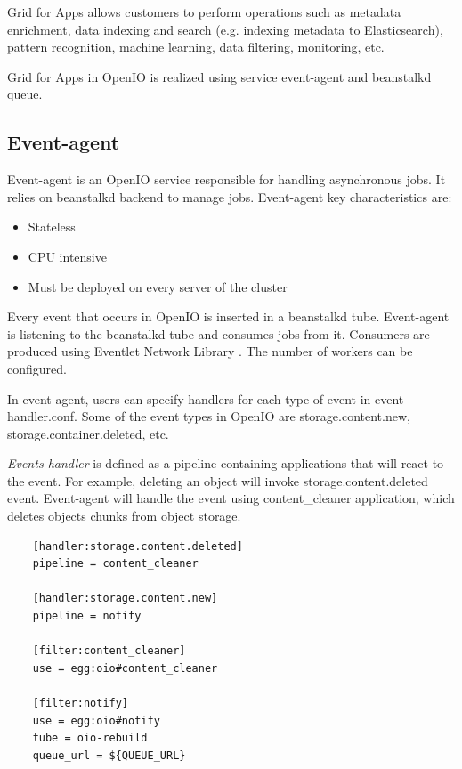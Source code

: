     Grid for Apps allows customers to perform operations such as metadata enrichment, data indexing and search (e.g. indexing metadata to Elasticsearch), pattern recognition, machine learning, data filtering, monitoring, etc\cite{oioNextGen}.

    Grid for Apps in OpenIO is realized using service event-agent and beanstalkd queue.

    \subsection{Event-agent}\label{sec:oioEvent-Agent}
    Event-agent is an OpenIO service responsible for handling asynchronous jobs. It relies on beanstalkd backend to manage jobs. Event-agent key characteristics are\cite{oioSdsServices}:
    \begin{itemize}
        \item Stateless
        \item CPU intensive
        \item Must be deployed on every server of the cluster
    \end{itemize}

    Every event that occurs in OpenIO is inserted in a beanstalkd tube. Event-agent is listening to the beanstalkd tube and consumes jobs from it. Consumers are produced using Eventlet Network Library \cite{oioEventlet}. The number of workers can be configured.

    In event-agent, users can specify handlers for each type of event in event-handler.conf.
    Some of the event types in OpenIO are storage.content.new, storage.container.deleted, etc.

    \textit{Events handler} is defined as a pipeline containing applications that will react to the event. For example, deleting an object will invoke storage.content.deleted event. Event-agent will handle the event using content\_cleaner application, which deletes objects chunks from object storage.

    \lstset{
        caption=Example of event-agent handler configuration,
        label=lst:event-agent-handlers
    }
    \begin{lstlisting}
    [handler:storage.content.deleted]
    pipeline = content_cleaner

    [handler:storage.content.new]
    pipeline = notify

    [filter:content_cleaner]
    use = egg:oio#content_cleaner

    [filter:notify]
    use = egg:oio#notify
    tube = oio-rebuild
    queue_url = ${QUEUE_URL}
    \end{lstlisting}

